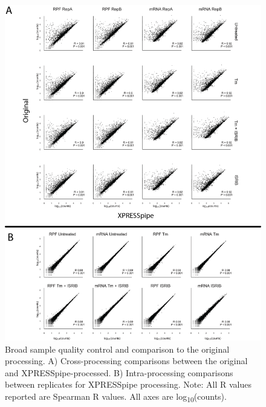 \documentclass[11pt, a4paper, oneside]{article}
\begin{document}
\begin{figure}
\centering
  \includegraphics[width=160mm]{figures/xpresspipe_figure2.png}
  \caption{Broad sample quality control and comparison to the original processing. A) Cross-processing comparisons between the original and XPRESSpipe-processed. B) Intra-processing comparisons between replicates for XPRESSpipe processing. Note: All R values reported are Spearman R values. All axes are log\textsubscript{10}(counts).}
  \label{fig:figure2}
\end{figure}
\end{document}
